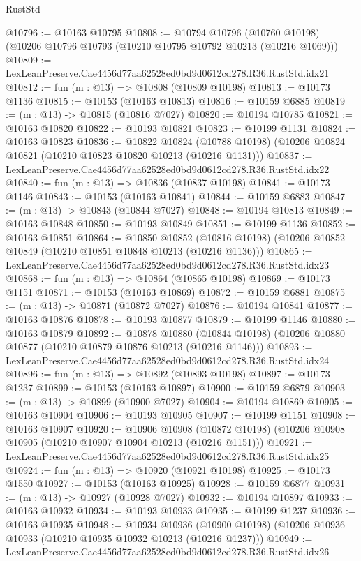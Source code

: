 \begin{lexlean}{RustStd}
\begin{coremodule}
@10796 := @10163 @10795
@10808 := @10794
    @10796
    (@10760 @10198)
    (@10206 @10796 @10793 (@10210 @10795 @10792 @10213 (@10216 @1069)))
@10809 := LexLeanPreserve.Cae4456d77aa62528ed0bd9d0612cd278.R36.RustStd.idx21
@10812 := fun (m : @13) => @10808 (@10809 @10198)
@10813 := @10173 @1136
@10815 := @10153 (@10163 @10813)
@10816 := @10159 @6885
@10819 := (m : @13) -> @10815 (@10816 @7027)
@10820 := @10194 @10785
@10821 := @10163 @10820
@10822 := @10193 @10821
@10823 := @10199 @1131
@10824 := @10163 @10823
@10836 := @10822
    @10824
    (@10788 @10198)
    (@10206 @10824 @10821 (@10210 @10823 @10820 @10213 (@10216 @1131)))
@10837 := LexLeanPreserve.Cae4456d77aa62528ed0bd9d0612cd278.R36.RustStd.idx22
@10840 := fun (m : @13) => @10836 (@10837 @10198)
@10841 := @10173 @1146
@10843 := @10153 (@10163 @10841)
@10844 := @10159 @6883
@10847 := (m : @13) -> @10843 (@10844 @7027)
@10848 := @10194 @10813
@10849 := @10163 @10848
@10850 := @10193 @10849
@10851 := @10199 @1136
@10852 := @10163 @10851
@10864 := @10850
    @10852
    (@10816 @10198)
    (@10206 @10852 @10849 (@10210 @10851 @10848 @10213 (@10216 @1136)))
@10865 := LexLeanPreserve.Cae4456d77aa62528ed0bd9d0612cd278.R36.RustStd.idx23
@10868 := fun (m : @13) => @10864 (@10865 @10198)
@10869 := @10173 @1151
@10871 := @10153 (@10163 @10869)
@10872 := @10159 @6881
@10875 := (m : @13) -> @10871 (@10872 @7027)
@10876 := @10194 @10841
@10877 := @10163 @10876
@10878 := @10193 @10877
@10879 := @10199 @1146
@10880 := @10163 @10879
@10892 := @10878
    @10880
    (@10844 @10198)
    (@10206 @10880 @10877 (@10210 @10879 @10876 @10213 (@10216 @1146)))
@10893 := LexLeanPreserve.Cae4456d77aa62528ed0bd9d0612cd278.R36.RustStd.idx24
@10896 := fun (m : @13) => @10892 (@10893 @10198)
@10897 := @10173 @1237
@10899 := @10153 (@10163 @10897)
@10900 := @10159 @6879
@10903 := (m : @13) -> @10899 (@10900 @7027)
@10904 := @10194 @10869
@10905 := @10163 @10904
@10906 := @10193 @10905
@10907 := @10199 @1151
@10908 := @10163 @10907
@10920 := @10906
    @10908
    (@10872 @10198)
    (@10206 @10908 @10905 (@10210 @10907 @10904 @10213 (@10216 @1151)))
@10921 := LexLeanPreserve.Cae4456d77aa62528ed0bd9d0612cd278.R36.RustStd.idx25
@10924 := fun (m : @13) => @10920 (@10921 @10198)
@10925 := @10173 @1550
@10927 := @10153 (@10163 @10925)
@10928 := @10159 @6877
@10931 := (m : @13) -> @10927 (@10928 @7027)
@10932 := @10194 @10897
@10933 := @10163 @10932
@10934 := @10193 @10933
@10935 := @10199 @1237
@10936 := @10163 @10935
@10948 := @10934
    @10936
    (@10900 @10198)
    (@10206 @10936 @10933 (@10210 @10935 @10932 @10213 (@10216 @1237)))
@10949 := LexLeanPreserve.Cae4456d77aa62528ed0bd9d0612cd278.R36.RustStd.idx26

\end{coremodule}
\end{lexlean}
